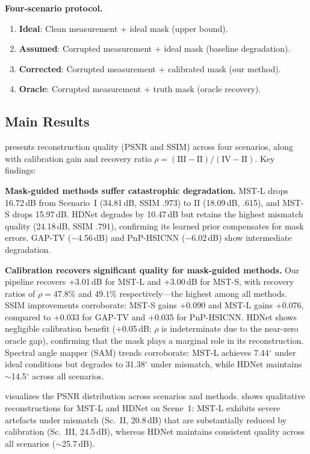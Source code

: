 \documentclass[runningheads]{llncs}
\begin{document}
\textbf{Four-scenario protocol.}
\begin{enumerate}
    \item[\textbf{I}] \textbf{Ideal}: Clean measurement + ideal mask (upper bound).
    \item[\textbf{II}] \textbf{Assumed}: Corrupted measurement + ideal mask (baseline degradation).
    \item[\textbf{III}] \textbf{Corrected}: Corrupted measurement + calibrated mask (our method).
    \item[\textbf{IV}] \textbf{Oracle}: Corrupted measurement + truth mask (oracle recovery).
\end{enumerate}

\subsection{Main Results}

 presents reconstruction quality (PSNR and SSIM) across four scenarios, along with calibration gain and recovery ratio $\rho = (\text{III} - \text{II}) / (\text{IV} - \text{II})$.
Key findings:

\textbf{Mask-guided methods suffer catastrophic degradation.}
MST-L drops 16.72\,dB from Scenario~I (34.81\,dB, SSIM .973) to II (18.09\,dB, .615), and MST-S drops 15.97\,dB.
HDNet degrades by 10.47\,dB but retains the highest mismatch quality (24.18\,dB, SSIM .791), confirming its learned prior compensates for mask errors.
GAP-TV ($-$4.56\,dB) and PnP-HSICNN ($-$6.02\,dB) show intermediate degradation.

\textbf{Calibration recovers significant quality for mask-guided methods.}
Our pipeline recovers +3.01\,dB for MST-L and +3.00\,dB for MST-S, with recovery ratios of $\rho = 47.8$\% and $49.1$\% respectively---the highest among all methods.
SSIM improvements corroborate: MST-S gains +0.090 and MST-L gains +0.076, compared to +0.033 for GAP-TV and +0.035 for PnP-HSICNN.
HDNet shows negligible calibration benefit (+0.05\,dB; $\rho$ is indeterminate due to the near-zero oracle gap), confirming that the mask plays a marginal role in its reconstruction.
Spectral angle mapper (SAM) trends corroborate: MST-L achieves 7.44$^\circ$ under ideal conditions but degrades to 31.38$^\circ$ under mismatch, while HDNet maintains ${\sim}$14.5$^\circ$ across all scenarios.

 visualizes the PSNR distribution across scenarios and methods.
 shows qualitative reconstructions for MST-L and HDNet on Scene~1: MST-L exhibits severe artefacts under mismatch (Sc.~II, 20.8\,dB) that are substantially reduced by calibration (Sc.~III, 24.5\,dB), whereas HDNet maintains consistent quality across all scenarios ($\sim$25.7\,dB).
\end{document}
